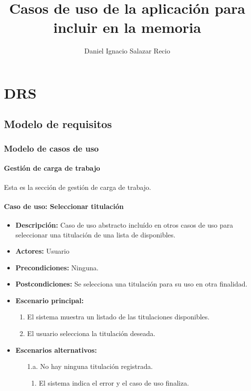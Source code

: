 \documentclass{book}
\title{Casos de uso de la aplicación para incluir en la memoria}
\author{Daniel Ignacio Salazar Recio}
\begin{document}
\maketitle
\chapter{DRS}
\section{Modelo de requisitos}
\subsection{Modelo de casos de uso}
\subsubsection*{Gestión de carga de trabajo}
Esta es la sección de gestión de carga de trabajo.


\subsubsection*{Caso de uso: Seleccionar titulación}
\label{select_titulacion}
\begin{itemize}
\item{\bf Descripción:} Caso de uso abstracto incluído en otros casos de uso para seleccionar una titulación de una lista de disponibles.
\item{\bf Actores:} Usuario
\item{\bf Precondiciones:} Ninguna.
\item{\bf Postcondiciones:} Se selecciona una titulación para su uso en otra finalidad.
\item{\bf Escenario principal:}
	\begin{enumerate}
	\item El sistema muestra un listado de las titulaciones disponibles.
	\item El usuario selecciona la titulación deseada.
	\end{enumerate}
\item{\bf Escenarios alternativos:}
	\begin{itemize}
		\item[1.a.] No hay ninguna titulación registrada.
		\begin{enumerate}
			\item El sistema indica el error y el caso de uso finaliza.
		\end{enumerate}
	\end{itemize}
\end{itemize}
\end{document}

